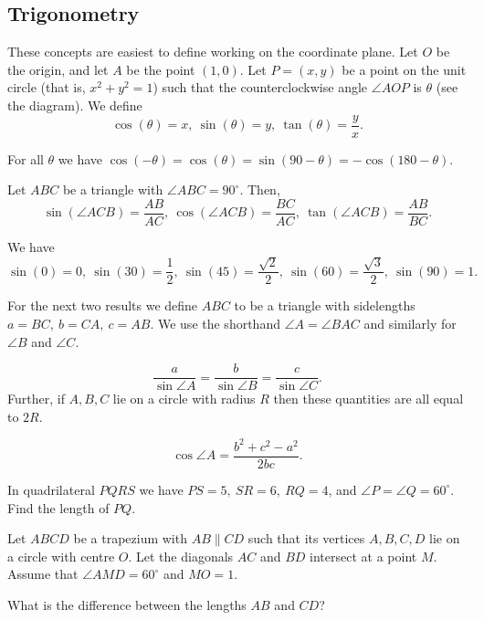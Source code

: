 \subsection{Trigonometry}
These concepts are easiest to define working on the coordinate plane. Let $O$ be
the origin, and let $A$ be the point $(1,0)$. 
Let $P=(x,y)$ be a point on the unit circle (that is, $x^2+y^2=1$) such that
the counterclockwise angle $\angle AOP$ is $\theta$ (see the diagram). We define
\[\cos(\theta)=x,\ \sin(\theta)=y,\ \tan(\theta)=\frac yx.\]
\begin{result}{\label{r:b:g:t:1}}
  For all $\theta$ we have
  $\cos(-\theta)=\cos(\theta)=\sin(90-\theta)=-\cos(180-\theta)$.
\end{result}
\begin{result}{\label{r:b:g:t:2}}
  Let $ABC$ be a triangle with $\angle ABC=90^\circ$. Then,
  \[\sin(\angle ACB)=\frac{AB}{AC},\ \cos(\angle ACB)=\frac{BC}{AC},\
    \tan(\angle ACB)=\frac{AB}{BC}.\]
\end{result}
\begin{result}{\label{r:b:g:t:3}}
  We have
  \[\sin(0)=0,\ \sin(30)=\frac 12,\ \sin(45)=\frac{\sqrt2}2,\
    \sin(60)=\frac{\sqrt3}2,\ \sin(90)=1.\]
\end{result}
For the next two results we define $ABC$ to be a triangle with sidelengths
$a=BC,\ b=CA,\ c=AB$. We use the shorthand $\angle A=\angle BAC$ and similarly
for $\angle B$ and $\angle C$.
\begin{result}{\label{r:b:g:t:4}}
  \[\frac a{\sin \angle A}=\frac b{\sin\angle B}=\frac c{\sin\angle C}.\]
  Further, if $A,B,C$ lie on a circle with radius $R$ then these quantities are
  all equal to $2R$.
\end{result}
\begin{result}{\label{r:b:g:t:5}}
  \[\cos\angle A=\frac{b^2+c^2-a^2}{2bc}.\]
\end{result}
\begin{problem}{\label{p:b:g:t:1}}
 In quadrilateral $PQRS$ we have $PS=5,\ SR=6,\ RQ=4$, and $\angle P=\angle
 Q=60^\circ$. Find the length of $PQ$.
\end{problem}
\begin{problem}{\label{p:b:g:t:2}}
  Let $ABCD$ be a trapezium with $AB\|CD$ such that its vertices $A,B,C,D$ lie
  on a circle with centre $O$. Let the diagonals $AC$ and $BD$ intersect at a
  point $M$. Assume that $\angle AMD=60^\circ$ and $MO=1$.

  What is the difference between the lengths $AB$ and $CD$?
\end{problem}
